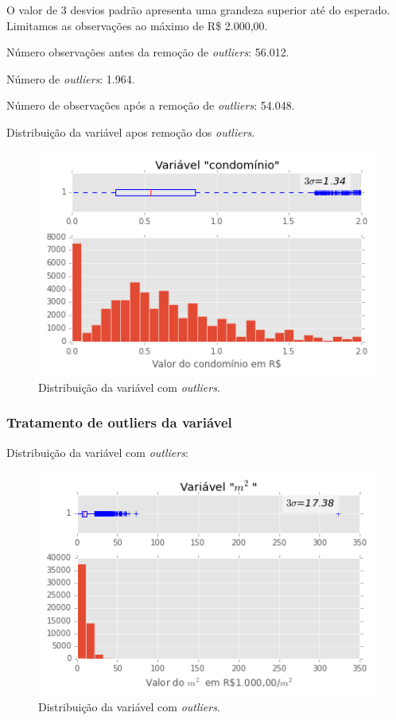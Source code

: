  O valor de 3 desvios padrão apresenta uma grandeza superior até do esperado. Limitamos as observações ao máximo de R\$ 2.000,00.
 
 Número observações antes da remoção de \textit{outliers}: 56.012. 
 
 Número de \textit{outliers}: 1.964.
 
 Número de observações após a remoção de \textit{outliers}: 54.048.
 
 Distribuição da variável  apos remoção dos \textit{outliers}.
 
 \begin{figure}[H]
 	\centering
 	\includegraphics[width=0.8\linewidth]{img/var_condominio_boxhist_depois}
 	\caption{Distribuição da variável  com \textit{outliers}.}
 	\label{fig:var_condominio_boxhist_depois}
 \end{figure}
 
 
 
 \subsubsection{Tratamento de outliers da variável }
 
 
 
 Distribuição da variável  com \textit{outliers}:
 
 
 \begin{figure}[H]
 	\centering
 	\includegraphics[width=0.8\linewidth]{img/var_m2_boxhist_antes}
 	\caption{Distribuição da variável  com \textit{outliers}.}
 	\label{fig:var_m2_boxhist_antes}
 \end{figure}
 
